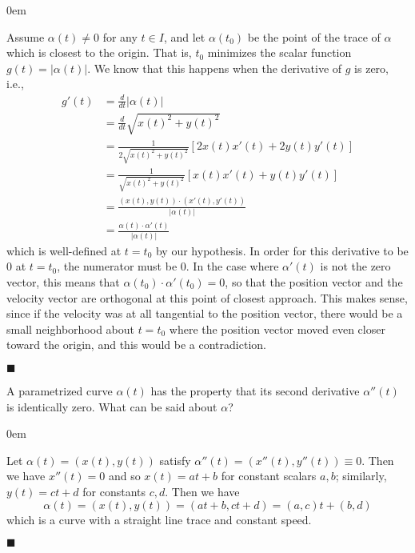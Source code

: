 \documentclass[12pt]{article}
\renewcommand{\qed}{\hfill$\blacksquare$}
\renewenvironment{proof}{\begin{addmargin}[1em]{0em}\begin{newproof}}{\end{newproof}\end{addmargin}\qed}
\newenvironment{problem}[2][Exercise]{\begin{trivlist}
\item[\hskip \labelsep {\bfseries #1}\hskip \labelsep {\bfseries #2.}]}{\end{trivlist}}
\begin{document}
\begin{proof}
Assume $\alpha\left(t\right)\neq 0$ for any $t \in I$, and let $\alpha\left(t_0\right)$ be the point of the trace of $\alpha$ which is closest to the origin. That is, $t_0$ minimizes the scalar function $g\left(t\right) = \left|\alpha\left(t\right)\right|$. We know that this happens when the derivative of $g$ is zero, i.e.,
\begin{align}
	g'\left(t\right) & = \frac{d}{dt} \left|\alpha\left(t\right)\right| \\
	& = \frac{d}{dt} \sqrt{x\left(t\right)^2 + y\left(t\right)^2} \\
	& = \frac{1}{2\sqrt{x\left(t\right)^2+y\left(t\right)^2}} \left[ 2x\left(t\right)x'\left(t\right) + 2y\left(t\right)y'\left(t\right)\right] \\
	& = \frac{1}{\sqrt{x\left(t\right)^2+y\left(t\right)^2}} \left[ x\left(t\right)x'\left(t\right) + y\left(t\right)y'\left(t\right)\right] \\
	& = \frac{\left(x\left(t\right),y\left(t\right)\right)\cdot \left(x'\left(t\right),y'\left(t\right)\right)}{\left| \alpha\left(t\right)\right|} \\
	& = \frac{\alpha\left(t\right)\cdot \alpha'\left(t\right)}{\left| \alpha\left(t\right)\right|}
\end{align}
which is well-defined at $t=t_0$ by our hypothesis. In order for this derivative to be $0$ at $t=t_0$, the numerator must be $0$. In the case where $ \alpha'\left(t\right)$ is not the zero vector, this means that $\alpha\left(t_0\right)\cdot \alpha'\left(t_0\right) = 0$, so that the position vector and the velocity vector are orthogonal at this point of closest approach. {\color{red} This makes sense, since if the velocity was at all tangential to the position vector, there would be a small neighborhood about $t=t_0$ where the position vector moved even closer toward the origin, and this would be a contradiction.}
\end{proof}


\begin{problem}{1.2.3}
A parametrized curve $\alpha\left(t\right)$ has the property that its second derivative $\alpha''\left(t\right)$ is identically zero. What can be said about $\alpha$?
\end{problem}
\begin{proof}
Let $\alpha\left(t\right) = \left(x\left(t\right),y\left(t\right)\right)$ satisfy $\alpha''\left(t\right) = \left(x''\left(t\right),y''\left(t\right)\right) \equiv 0$. Then we have $x''\left(t\right)=0$ and so $x\left(t\right) = at+b$ for constant scalars $a,b$; similarly, $y\left(t\right)=ct+d$ for constants $c,d$. Then we have \[ \alpha\left(t\right) = \left(x\left(t\right),y\left(t\right)\right) = \left(at+b,ct+d\right) = \left(a,c\right)t + \left(b,d\right) \] which is a curve with a straight line trace and constant speed.
\end{proof}
\end{document}
